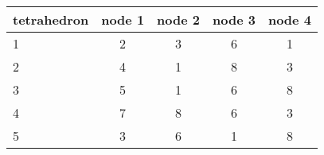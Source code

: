 \begin{center}
\begin{tabular}{lcccc}
\hline
tetrahedron & node 1& node 2& node 3& node 4  \\
\hline
\hline
1&2&3&6&1 \\
2&4&1&8&3 \\
3&5&1&6&8 \\
4&7&8&6&3 \\
5&3&6&1&8 \\
\hline
\end{tabular}
\end{center}



